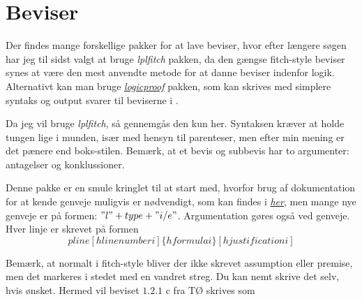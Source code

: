 \documentclass[a4, danish]{article}
\begin{document}
\section{Beviser}
Der findes mange forskellige pakker for at lave beviser, hvor efter længere søgen har jeg til sidst valgt at bruge \emph{lplfitch} pakken, da den gængse fitch-style beviser synes at være den mest anvendte metode for at danne beviser indenfor logik. Alternativt kan man bruge \href{http://mirrors.dotsrc.org/ctan/macros/latex/contrib/logicproof/logicproof.pdf}{\emph{logicproof}} pakken, som kan skrives med simplere syntaks og output svarer til beviserne i \cite{berlog}.


Da jeg vil bruge \emph{lplfitch}, så gennemgås den kun her. Syntaksen kræver at holde tungen lige i munden, især med hensyn til parenteser, men efter min mening er det pænere end boks-stilen. Bemærk, at et bevis og subbevis har to argumenter: antagelser og konklussioner.
\begin{center}
\end{center}

Denne pakke er en smule kringlet til at start med, hvorfor brug af dokumentation for at kende genveje muligvis er nødvendigt, som kan findes i \href{http://mirrors.dotsrc.org/ctan/macros/latex/contrib/lplfitch/lplfitch.pdf}{\emph{her}}, men mange nye genveje er på formen: $"l" + type + "i/e"$. Argumentation gøres også ved genveje. Hver linje er skrevet på formen
\begin{equation*}
    pline[hline number i]\{hformulai\}[hjustificationi]
\end{equation*}


Bemærk, at normalt i fitch-style bliver der ikke skrevet assumption eller premise, men det markeres i stedet med en vandret streg. Du kan nemt skrive det selv, hvis ønsket. Hermed vil beviset $1.2.1$ c fra TØ skrives som
\begin{center}
\end{center}
\end{document}
